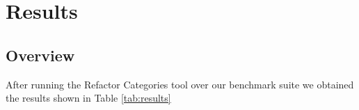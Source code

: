 % 
% 
% 



\section{Results}
\subsection{Overview}
After running the Refactor Categories tool over our benchmark suite we obtained the results shown in Table \ref{tab:results}



